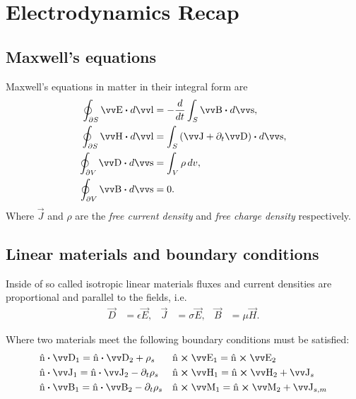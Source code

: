 \documentclass[margin=normal]{tex/hsrzf}
\theoremstyle{elmagzf}
\begin{document}
\section{Electrodynamics Recap}

\subsection{Maxwell's equations}

Maxwell's equations in matter in their integral form are
\begin{subequations}
  \begin{align}
    \oint_{\partial S} \vec{E} \dotp d\vec{l} &= -\frac{d}{dt} \int_S \vec{B} \dotp d\vec{s}, \\
    \oint_{\partial S} \vec{H} \dotp d\vec{l} &= \int_S \left(
      \vec{J} + \partial_t \vec{D}
    \right) \dotp d\vec{s}, \\
    \oint_{\partial V} \vec{D} \dotp d\vec{s} &= \int_V \rho \,dv, \\
    \oint_{\partial V} \vec{B} \dotp d\vec{s} &= 0.
  \end{align}
\end{subequations}
Where \(\vec{J}\) and \(\rho\) are the \emph{free current density} and
\emph{free charge density} respectively.

\subsection{Linear materials and boundary conditions}

Inside of so called isotropic linear materials fluxes and current
densities are proportional and parallel to the fields, i.e.
\begin{align*}
  \vec{D} &= \epsilon \vec{E}, & \vec{J} &= \sigma \vec{E}, & \vec{B} &= \mu \vec{H}.
\end{align*}

Where two materials meet the following boundary conditions must be satisfied:
\begin{align*}
  &\uvec{n} \dotp \vec{D}_1 = \uvec{n} \dotp \vec{D}_2 + \rho_s &
    &\uvec{n} \crossp \vec{E}_1 = \uvec{n} \crossp \vec{E}_2 \\
  &\uvec{n} \dotp \vec{J}_1 = \uvec{n} \dotp \vec{J}_2 - \partial_t \rho_s &
    &\uvec{n} \crossp \vec{H}_1 = \uvec{n} \crossp \vec{H}_2 + \vec{J}_s \\
  &\uvec{n} \dotp \vec{B}_1 = \uvec{n} \dotp \vec{B}_2 - \partial_t \rho_s &
    &\uvec{n} \crossp \vec{M}_1 = \uvec{n} \crossp \vec{M}_2 + \vec{J}_{s,m}
\end{align*}
\end{document}

